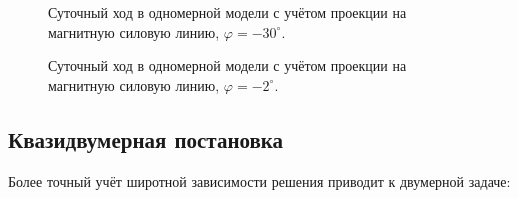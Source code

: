 \documentclass[14pt, a4paper, fleqn, twoside]{extreport}
\begin{document}
\begin{figure}[H]
\caption{Суточный ход в одномерной модели с учётом проекции на магнитную силовую линию, $\varphi = -30^\circ$.}
\end{figure}

\begin{figure}[H]
\caption{Суточный ход в одномерной модели с учётом проекции на магнитную силовую линию, $\varphi = -2^\circ$.}
\end{figure}

\newpage 

\subsection*{Квазидвумерная постановка}

Более точный учёт широтной зависимости решения приводит к двумерной задаче:
\end{document}

